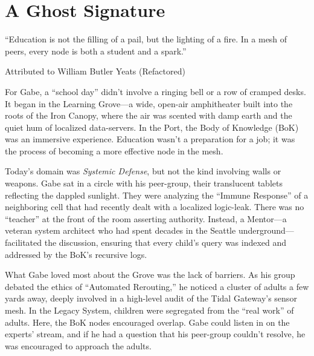 \chapter{A Ghost Signature}
\label{chap:07}

\epigraph{“Education is not the filling of a pail, but the lighting of a fire. In a mesh of peers, every node is both a student and a spark.”}{Attributed to William Butler Yeats (Refactored)}


For Gabe, a ``school day'' didn't involve a ringing bell or a row of cramped desks. It began in the Learning Grove—a wide, open-air amphitheater built into the roots of the Iron Canopy, where the air was scented with damp earth and the quiet hum of localized data-servers. In the Port, the Body of Knowledge (BoK) was an immersive experience. Education wasn't a preparation for a job; it was the process of becoming a more effective node in the mesh.

Today's domain was \textit{Systemic Defense}, but not the kind involving walls or weapons. Gabe sat in a circle with his peer-group, their translucent tablets reflecting the dappled sunlight. They were analyzing the ``Immune Response'' of a neighboring cell that had recently dealt with a localized logic-leak. There was no ``teacher'' at the front of the room asserting authority. Instead, a Mentor—a veteran system architect who had spent decades in the Seattle underground—facilitated the discussion, ensuring that every child's query was indexed and addressed by the BoK's recursive logs.


What Gabe loved most about the Grove was the lack of barriers. As his group debated the ethics of ``Automated Rerouting,'' he noticed a cluster of adults a few yards away, deeply involved in a high-level audit of the Tidal Gateway's sensor mesh. In the Legacy System, children were segregated from the ``real work'' of adults. Here, the BoK nodes encouraged overlap. Gabe could listen in on the experts' stream, and if he had a question that his peer-group couldn't resolve, he was encouraged to approach the adults. 


